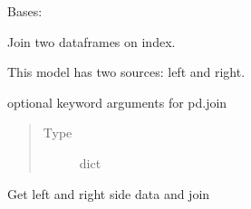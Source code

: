 \documentclass[letterpaper,10pt,english]{sphinxmanual}
\begin{document}
\begin{fulllineitems}
\label{\detokenize{dalio.model:dalio.model.Join}}
Bases: {\hyperref[\detokenize{dalio.model:dalio.model.model.Model}]{}}

Join two dataframes on index.

This model has two sources: left and right.

\begin{fulllineitems}
\label{\detokenize{dalio.model:dalio.model.Join._kwargs}}
optional keyword arguments for pd.join
\begin{quote}\begin{description}
\item[{Type}] \leavevmode
dict

\end{description}\end{quote}

\end{fulllineitems}


\begin{fulllineitems}
\label{\detokenize{dalio.model:dalio.model.Join.run}}
Get left and right side data and join

\end{fulllineitems}


\end{fulllineitems}

\end{document}
